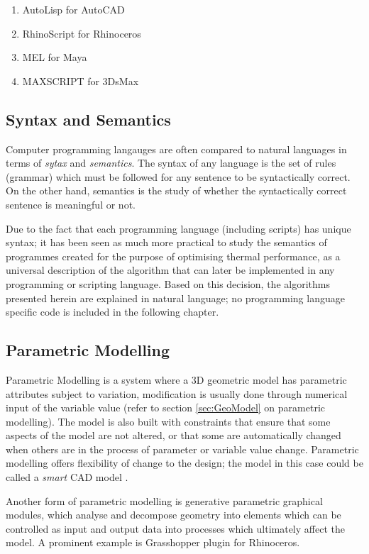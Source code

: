 \vspace{-0.5cm}
\begin{enumerate}
\item AutoLisp for AutoCAD
\item RhinoScript for Rhinoceros
\item MEL for Maya
\item MAXSCRIPT for 3DsMax
\end{enumerate}

\subsection{Syntax and Semantics}

Computer programming langauges are often compared to natural languages in terms of \emph{sytax} and \emph{semantics}. The syntax of any language is the set of rules (grammar) which must be followed for any sentence to be syntactically correct. On the other hand, semantics is the study of whether the syntactically correct sentence is meaningful or not.

Due to the fact that each programming language (including scripts) has unique syntax; it has been seen as much more practical to study the semantics of programmes created for the purpose of optimising thermal performance, as a universal description of the algorithm that can later be implemented in any programming or scripting language. Based on this decision, the algorithms presented herein are explained in natural language; no programming language specific code is included in the following chapter.

\subsection{Parametric Modelling}

Parametric Modelling is a system where a 3D geometric model has parametric attributes subject to variation, modification is usually done through numerical input of the variable value (refer to section \ref{sec:GeoModel} on parametric modelling). The model is also built with constraints that ensure that some aspects of the model are not altered, or that some are automatically changed when others are in the process of parameter or variable value change. Parametric modelling offers flexibility of change to the design; the model in this case could be called a \emph{smart} CAD model \cite{kashyap01}.

Another form of parametric modelling is generative parametric graphical modules, which analyse and decompose geometry into elements which can be controlled as input and output data into processes which ultimately affect the model. A prominent example is Grasshopper plugin for Rhinoceros.

